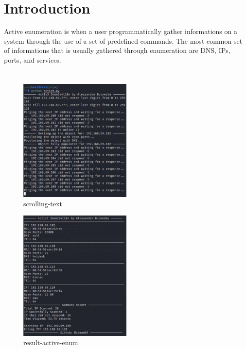 \section{Introduction}
\label{s:lab2-introduction}
Active enumeration is when a user programmatically gather informations on a system through
the use of a set of predefined commands. The most common set of informations that is
usually gathered through enumeration are DNS, IPs, ports, and services.

\section{}

\begin{figure}[H]
  \centering
  \includegraphics[width=0.5\textwidth]{figures/scrolling-text}
  \caption{scrolling-text}
  \label{f:scrolling-text}
\end{figure}

\begin{figure}[H]
  \centering
  \includegraphics[width=0.5\textwidth]{figures/result-active-enum}
  \caption{result-active-enum}
  \label{f:result-active-enum}
\end{figure}

